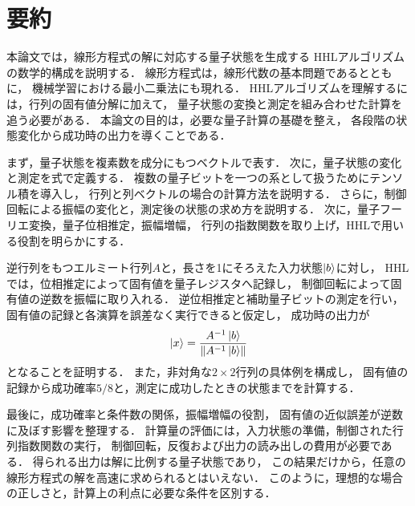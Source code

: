 \chapter*{要約}

本論文では，線形方程式の解に対応する量子状態を生成する
HHLアルゴリズムの数学的構成を説明する．
線形方程式は，線形代数の基本問題であるとともに，
機械学習における最小二乗法にも現れる．
HHLアルゴリズムを理解するには，行列の固有値分解に加えて，
量子状態の変換と測定を組み合わせた計算を追う必要がある．
本論文の目的は，必要な量子計算の基礎を整え，
各段階の状態変化から成功時の出力を導くことである．

まず，量子状態を複素数を成分にもつベクトルで表す．
次に，量子状態の変化と測定を式で定義する．
複数の量子ビットを一つの系として扱うためにテンソル積を導入し，
行列と列ベクトルの場合の計算方法を説明する．
さらに，制御回転による振幅の変化と，測定後の状態の求め方を説明する．
次に，量子フーリエ変換，量子位相推定，振幅増幅，
行列の指数関数を取り上げ，HHLで用いる役割を明らかにする．

逆行列をもつエルミート行列$A$と，長さを1にそろえた入力状態$\ket b$に対し，
HHLでは，位相推定によって固有値を量子レジスタへ記録し，
制御回転によって固有値の逆数を振幅に取り入れる．
逆位相推定と補助量子ビットの測定を行い，
固有値の記録と各演算を誤差なく実行できると仮定し，
成功時の出力が
\[
  \ket x=\frac{A^{-1}\ket b}{\lVert A^{-1}\ket b\rVert}
\]
となることを証明する．
また，非対角な$2\times2$行列の具体例を構成し，
固有値の記録から成功確率$5/8$と，測定に成功したときの状態までを計算する．

最後に，成功確率と条件数の関係，振幅増幅の役割，
固有値の近似誤差が逆数に及ぼす影響を整理する．
計算量の評価には，入力状態の準備，制御された行列指数関数の実行，
制御回転，反復および出力の読み出しの費用が必要である．
得られる出力は解に比例する量子状態であり，
この結果だけから，任意の線形方程式の解を高速に求められるとはいえない．
このように，理想的な場合の正しさと，計算上の利点に必要な条件を区別する．

\newpage

